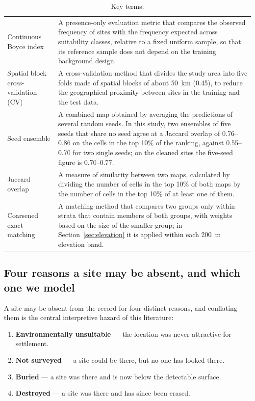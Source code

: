 \documentclass[12pt]{article}
\begin{document}
\begin{table}[htbp]
\begin{tabular}{@{}>{\raggedright\arraybackslash}p{3.6cm}p{12.0cm}@{}}
Continuous Boyce index & A presence-only evaluation metric that compares the observed frequency of sites with the frequency expected across suitability classes, relative to a fixed uniform sample, so that its reference sample does not depend on the training background design. \\
Spatial block cross-validation (CV) & A cross-validation method that divides the study area into five folds made of spatial blocks of about 50~km (0.45\textdegree{}), to reduce the geographical proximity between sites in the training and the test data. \\
Seed ensemble & A combined map obtained by averaging the predictions of several random seeds. In this study, two ensembles of five seeds that share no seed agree at a Jaccard overlap of 0.76--0.86 on the cells in the top 10\% of the ranking, against 0.55--0.70 for two single seeds; on the cleaned sites the five-seed figure is 0.70--0.77. \\
Jaccard overlap & A measure of similarity between two maps, calculated by dividing the number of cells in the top 10\% of both maps by the number of cells in the top 10\% of at least one of them. \\
Coarsened exact matching & A matching method that compares two groups only within strata that contain members of both groups, with weights based on the size of the smaller group; in Section~\ref{sec:elevation} it is applied within each 200~m elevation band. \\
\bottomrule
\end{tabular}
\caption{Key terms.}
\label{tab:keyterms}
\end{table}

\subsection{Four reasons a site may be absent, and which one we model}

\label{sec:taxonomy}

A site may be absent from the record for four distinct reasons, and conflating them is the central interpretive hazard of this literature:

\begin{enumerate}
  \item \textbf{Environmentally unsuitable} --- the location was never attractive for settlement.
  \item \textbf{Not surveyed} --- a site could be there, but no one has looked there.
  \item \textbf{Buried} --- a site was there and is now below the detectable surface.
  \item \textbf{Destroyed} --- a site was there and has since been erased.
\end{enumerate}
\end{document}
